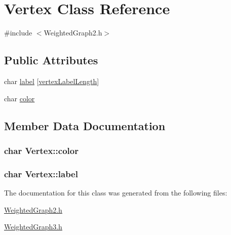 \hypertarget{class_vertex}{\section{Vertex Class Reference}
\label{class_vertex}
}


{\ttfamily \#include $<$Weighted\-Graph2.\-h$>$}

\subsection*{Public Attributes}
\begin{DoxyCompactItemize}
\item 
char \hyperlink{class_vertex_a13fe33790b41909253d58bb546c4402f}{label} \mbox{[}\hyperlink{_weighted_graph3_8h_a4544df76d516b194b13a006d7942a190}{vertex\-Label\-Length}\mbox{]}
\item 
char \hyperlink{class_vertex_ab9455c96462d157dd94b7c1e7cdff135}{color}
\end{DoxyCompactItemize}


\subsection{Member Data Documentation}
\hypertarget{class_vertex_ab9455c96462d157dd94b7c1e7cdff135}{
\subsubsection[{color}]{\setlength{\rightskip}{0pt plus 5cm}char Vertex\-::color}}\label{class_vertex_ab9455c96462d157dd94b7c1e7cdff135}
\hypertarget{class_vertex_a13fe33790b41909253d58bb546c4402f}{
\subsubsection[{label}]{\setlength{\rightskip}{0pt plus 5cm}char Vertex\-::label}}\label{class_vertex_a13fe33790b41909253d58bb546c4402f}


The documentation for this class was generated from the following files\-:\begin{DoxyCompactItemize}
\item 
\hyperlink{_weighted_graph2_8h}{Weighted\-Graph2.\-h}\item 
\hyperlink{_weighted_graph3_8h}{Weighted\-Graph3.\-h}\end{DoxyCompactItemize}
